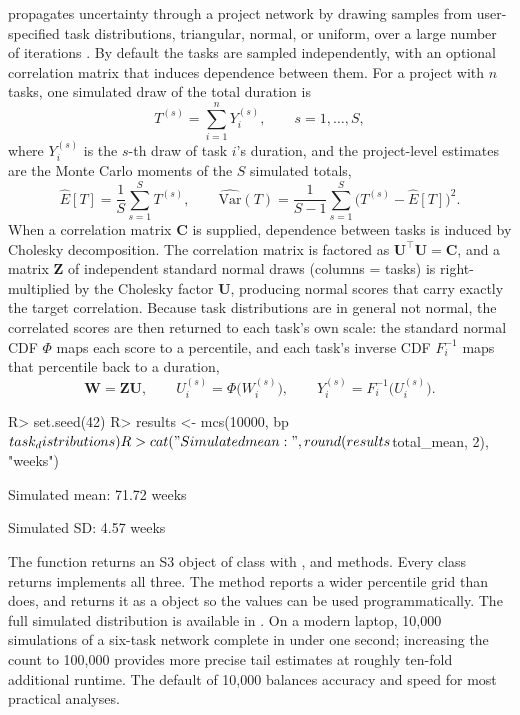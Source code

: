 \documentclass[
]{jss}
\begin{document}
 propagates uncertainty through a project network by drawing
samples from user-specified task distributions, triangular, normal, or
uniform, over a large number of iterations \citep{Vose2008}. By default
the tasks are sampled independently, with an optional correlation matrix
that induces dependence between them. For a project with \(n\) tasks,
one simulated draw of the total duration is
\[T^{(s)} = \sum_{i=1}^{n} Y_i^{(s)}, \qquad s = 1, \ldots, S,\] where
\(Y_i^{(s)}\) is the \(s\)-th draw of task \(i\)'s duration, and the
project-level estimates are the Monte Carlo moments of the \(S\)
simulated totals,
\[\hat{E}[T] = \frac{1}{S}\sum_{s=1}^{S} T^{(s)}, \qquad
  \widehat{\text{Var}}(T) = \frac{1}{S-1}\sum_{s=1}^{S}\bigl(T^{(s)} - \hat{E}[T]\bigr)^2.\]
When a correlation matrix \(\mathbf{C}\) is supplied, dependence between
tasks is induced by Cholesky decomposition. The correlation matrix is
factored as \(\mathbf{U}^\top\mathbf{U} = \mathbf{C}\), and a matrix
\(\mathbf{Z}\) of independent standard normal draws (columns = tasks) is
right-multiplied by the Cholesky factor \(\mathbf{U}\), producing normal
scores that carry exactly the target correlation. Because task
distributions are in general not normal, the correlated scores are then
returned to each task's own scale: the standard normal CDF \(\Phi\) maps
each score to a percentile, and each task's inverse CDF \(F_i^{-1}\)
maps that percentile back to a duration,
\[\mathbf{W} = \mathbf{Z}\mathbf{U}, \qquad
  U_i^{(s)} = \Phi\bigl(W_i^{(s)}\bigr), \qquad
  Y_i^{(s)} = F_i^{-1}\bigl(U_i^{(s)}\bigr).\]

\begin{CodeChunk}
\begin{CodeInput}
R> set.seed(42)
R> results <- mcs(10000, bp$task_distributions)
R> cat("Simulated mean:", round(results$total_mean, 2), "weeks\n")
\end{CodeInput}
\begin{CodeOutput}
Simulated mean: 71.72 weeks
\end{CodeOutput}
\begin{CodeOutput}
Simulated SD:   4.57 weeks
\end{CodeOutput}
\end{CodeChunk}

The  function returns an S3 object of class 
with ,  and  methods. Every
class  returns implements all three. The 
method reports a wider percentile grid than  does, and
returns it as a  object so the values can be used
programmatically. The full simulated distribution is available in
. On a modern laptop, 10,000
simulations of a six-task network complete in under one second;
increasing the count to 100,000 provides more precise tail estimates at
roughly ten-fold additional runtime. The default of 10,000 balances
accuracy and speed for most practical analyses.
\end{document}
